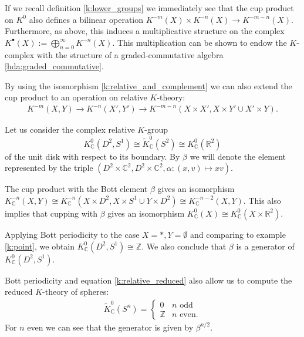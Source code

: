 {    \begin{property}
        If we recall definition \ref{k:lower_groups} we immediately see that the cup product on $K^0$ also defines a bilinear operation $K^{-m}(X)\times K^{-n}(X)\rightarrow K^{-m-n}(X)$. Furthermore, as above, this induces a multiplicative structure on the complex $K^\bullet(X):=\bigoplus_{n=0}^\infty K^{-n}(X)$. This multiplication can be shown to endow the $K$-complex with the structure of a graded-commutative algebra \ref{hda:graded_commutative}.

        By using the isomorphism \ref{k:relative_and_complement} we can also extend the cup product to an operation on relative $K$-theory:
        \begin{gather}
            K^{-m}(X, Y)\rightarrow K^{-n}(X', Y')\rightarrow K^{-m-n}(X\times X', X\times Y'\cup X'\times Y).
        \end{gather}
    \end{property}

    \begin{notation}
        Let us consider the complex relative $K$-group \[K^0_{\mathbb{C}}(D^2, S^1)\cong\widetilde{K}^0_{\mathbb{C}}(S^2)\cong K^0_{\mathbb{C}}(\mathbb{R}^2)\] of the unit disk with respect to its boundary. By $\beta$ we will denote the element represented by the triple $\left(D^2\times\mathbb{C}^2, D^2\times\mathbb{C}^2, \alpha:(x,v)\mapsto xv\right)$.
    \end{notation}
    \begin{theorem}
        The cup product with the Bott element $\beta$ gives an isomorphism $K^{-n}_{\mathbb{C}}(X, Y)\cong K^{-n}_{\mathbb{C}}(X\times D^2, X\times S^1\cup Y\times D^2)\cong K^{-n-2}_{\mathbb{C}}(X, Y)$. This also implies that cupping with $\beta$ gives an isomorphism $K^0_{\mathbb{C}}(X)\cong K^0_{\mathbb{C}}(X\times\mathbb{R}^2)$.
    \end{theorem}
    \begin{result}
        Applying Bott periodicity to the case $X=\ast, Y=\emptyset$ and comparing to example \ref{k:point}, we obtain $K^0_{\mathbb{C}}(D^2, S^1)\cong\mathbb{Z}$. We also conclude that $\beta$ is a generator of $K^0_{\mathbb{C}}(D^2, S^1)$.
    \end{result}
    \begin{result}[Spheres]
        Bott periodicity and equation \ref{k:relative_reduced} also allow us to compute the reduced $K$-theory of spheres:
        \begin{gather}
            \widetilde{K}^0_{\mathbb{C}}(S^n) =
            \begin{cases}
                0&n\text{ odd}\\
                \mathbb{Z}&n\text{ even}.
            \end{cases}
        \end{gather}
        For $n$ even we can see that the generator is given by $\beta^{n/2}$.
    \end{result}

}
